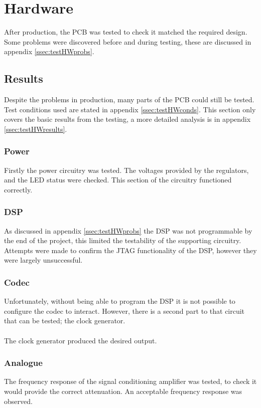 \section{Hardware}

After production, the PCB was tested to check it matched the required design.
Some problems were discovered before and during testing, these are discussed in appendix \ref{ssec:testHWprobs}.

\subsection{Results}
Despite the problems in production, many parts of the PCB could still be tested.
Test conditions used are stated in appendix \ref{ssec:testHWconds}.
This section only covers the basic results from the testing, a more detailed analysis is in appendix \ref{ssec:testHWresults}.

\subsubsection{Power}
Firstly the power circuitry was tested.
The voltages provided by the regulators, and the LED status were checked.
This section of the circuitry functioned correctly.

\subsubsection{DSP}
As discussed in appendix \ref{ssec:testHWprobs} the DSP was not programmable by the end of the project, this limited the testability of the supporting circuitry.
Attempts were made to confirm the JTAG functionality of the DSP, however they were largely unsuccessful.
\subsubsection{Codec}
Unfortunately, without being able to program the DSP it is not possible to configure the codec to interact.
However, there is a second part to that circuit that can be tested; the clock generator.
\\
\\
The clock generator produced the desired output. 

\subsubsection{Analogue}
The frequency response of the signal conditioning amplifier was tested, to check it would provide the correct attenuation.
An acceptable frequency response was observed.
